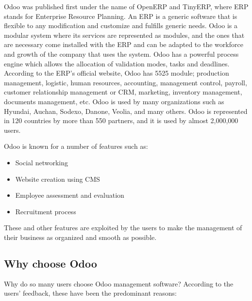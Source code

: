 Odoo was published first under the name of OpenERP and TinyERP, where ERP stands for
Enterprise Resource Planning. An ERP is a generic software that is flexible to any modification
and customize and fulfills generic needs. Odoo is a modular system where its services are
represented as modules, and the ones that are necessary come installed with the ERP and can be
adapted to the workforce and growth of the company that uses the system. Odoo has a powerful
process engine which allows the allocation of validation modes, tasks and deadlines. According
to the ERP’s official website, Odoo has 5525 module; production management, logistic, human
resources, accounting, management control, payroll, customer relationship management or CRM,
marketing, inventory management, documents management, etc. Odoo is used by many
organizations such as Hyundai, Auchan, Sodexo, Danone, Veolia, and many others.
Odoo is represented in 120 countries by more than 550 partners, and it is used by almost
2,000,000 users.

Odoo is known for a number of features such as:

\begin{itemize}
	\item Social networking
	\item Website creation using CMS
	\item Employee assessment and evaluation
	\item Recruitment process
\end{itemize}

These and other features are exploited by the users to make the management of their business as
organized and smooth as possible.

\subsection{Why choose Odoo}

Why do so many users choose Odoo management software? According to the users’ feedback, these
have been the predominant reasons:


